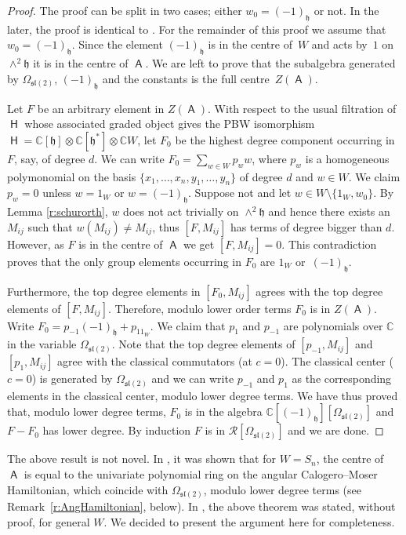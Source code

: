 \documentclass[pdftex]{sigma}
\numberwithin{equation}{section}
\newcommand{\fh}{\mathfrak{h}}
\newcommand{\fl}{\mathfrak{l}}
\newcommand{\fs}{\mathfrak{s}}
\newcommand{\bbc}{\mathbb{C}}
\DeclareMathOperator{\rca}{\mathsf{H}}
\DeclareMathOperator{\ama}{\mathsf{A}}
\begin{document}
\begin{proof}
 The proof can be split in two cases; either $w_0=(-1)_\fh$ or not. In the later, the proof is identical to \cite[Theorem~5]{FH15}. For the remainder of this proof we assume that $w_0=(-1)_\fh$. Since the element $(-1)_\fh$ is in the centre of~$W$ and acts by~$1$ on $\wedge^2 \mathfrak{h}$ it is in the centre of $\ama$. We are left to prove that the subalgebra generated by $\Omega_{\fs\fl(2)}$, $(-1)_\fh$ and the constants is the full centre~$Z(\ama)$.

 Let $F$ be an arbitrary element in $Z(\ama)$. With respect to the usual filtration of $\rca$ whose associated graded object gives the PBW isomorphism $\rca = \bbc[\fh]\otimes\bbc[\fh^*]\otimes\bbc W$, let $F_0$ be the highest degree component occurring in $F$, say, of degree $d$. We can write $F_0 = \sum_{w\in W}p_w w$, where $p_w$ is a homogeneous polymonomial on the basis $\{x_1,\dots,x_n,y_1,\dots,y_n\}$ of degree $d$ and $w\in W$. We claim $p_w=0$ unless $w=1_W$ or $w=(-1)_\fh$. Suppose not and let $w \in W\setminus\{1_W,w_0\}$. By Lemma \ref{r:schurorth}, $w$ does not act trivially on $\wedge^2{\fh}$ and hence there exists an $M_{ij}$ such that $w(M_{ij}) \neq M_{ij}$, thus $[F,M_{ij}]$ has terms of degree bigger than $d$. However, as $F$ is in the centre of $\ama$ we get $[F,M_{ij}]=0$. This contradiction proves that the only group elements occurring in $F_0$ are $1_W$ or~$(-1)_\fh$.

 Furthermore, the top degree elements in $[F_0,M_{ij}]$ agrees with the top degree elements of $[F,M_{ij}]$. Therefore, modulo lower order terms $F_0$ is in $Z(\ama)$. Write $F_0 = p_{-1}(-1)_\fh+ p_11_W$. We claim that $p_{1}$ and $p_{-1}$ are polynomials over $\mathbb{C}$ in the variable $\Omega_{\fs\fl(2)}$. Note that the top degree elements of $[p_{-1},M_{ij}]$ and $[p_{1},M_{ij}]$ agree with the classical commutators (at $c=0$). The classical center ($c=0$) is generated by $\Omega_{\fs\fl(2)}$ and we can write $p_{-1}$ and $p_{1}$ as the corresponding elements in the classical center, modulo lower degree terms. We have thus proved that, modulo lower degree terms, $F_0$ is in the algebra
 $\mathbb{C}[(-1)_\fh][\Omega_{\fs\fl(2)}]$ and $F-F_0$ has lower degree. By induction $F$ is in $\mathcal{R}[\Omega_{\fs\fl(2)}]$ and we are done.
\end{proof}

\begin{Remark}
The above result is not novel. In \cite{FH15}, it was shown that for $W=S_n$, the centre of~$\ama$ is equal to the univariate polynomial ring on the angular Calogero--Moser Hamiltonian, which coincide with $\Omega_{\mathfrak{sl}(2)}$, modulo lower degree terms (see Remark~\ref{r:AngHamiltonian}, below). In \cite[Remark~3.3]{FH19}, the above theorem was stated, without proof, for general $W$. We decided to present the argument here for completeness.
\end{Remark}
\end{document}
